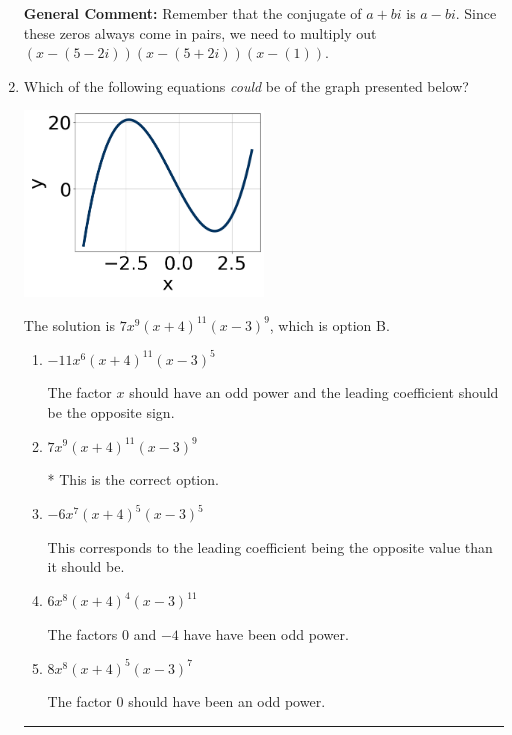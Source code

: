 \documentclass{extbook}[14pt]
\newcommand{\litem}[1]{\item #1

\rule{\textwidth}{0.4pt}}
\begin{document}
\begin{enumerate}
{\textbf{General Comment:} Remember that the conjugate of $a+bi$ is $a-bi$. Since these zeros always come in pairs, we need to multiply out $(x-(5 - 2 i))(x-(5 + 2 i))(x-(1))$.
}
\litem{
Which of the following equations \textit{could} be of the graph presented below?

\begin{center}
    \includegraphics[width=0.5\textwidth]{../Figures/polyGraphToFunctionCopyC.png}
\end{center}


The solution is \( 7x^{9} (x + 4)^{11} (x - 3)^{9} \), which is option B.\begin{enumerate}[label=\Alph*.]
\item \( -11x^{6} (x + 4)^{11} (x - 3)^{5} \)

The factor $x$ should have an odd power and the leading coefficient should be the opposite sign.
\item \( 7x^{9} (x + 4)^{11} (x - 3)^{9} \)

* This is the correct option.
\item \( -6x^{7} (x + 4)^{5} (x - 3)^{5} \)

This corresponds to the leading coefficient being the opposite value than it should be.
\item \( 6x^{8} (x + 4)^{4} (x - 3)^{11} \)

The factors $0$ and $-4$ have have been odd power.
\item \( 8x^{8} (x + 4)^{5} (x - 3)^{7} \)

The factor $0$ should have been an odd power.
\end{enumerate}

}
\end{enumerate}
\end{document}
